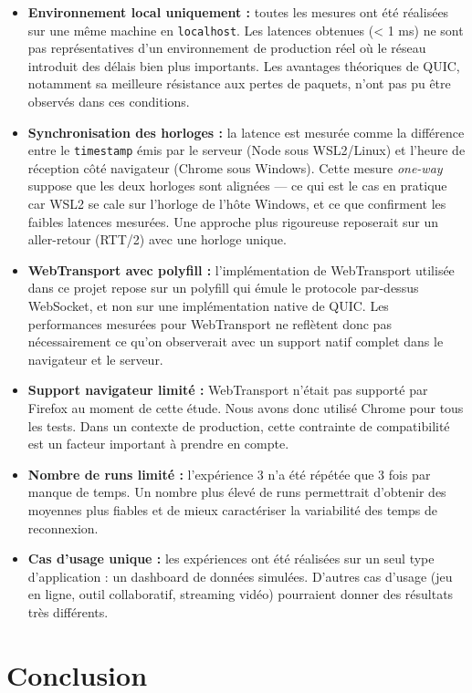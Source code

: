 \begin{itemize}
    \item \textbf{Environnement local uniquement :} toutes les mesures ont été réalisées sur une même machine en \texttt{localhost}. Les latences obtenues (< 1 ms) ne sont pas représentatives d'un environnement de production réel où le réseau introduit des délais bien plus importants. Les avantages théoriques de QUIC, notamment sa meilleure résistance aux pertes de paquets, n'ont pas pu être observés dans ces conditions.
    \item \textbf{Synchronisation des horloges :} la latence est mesurée comme la différence entre le \texttt{timestamp} émis par le serveur (Node sous WSL2/Linux) et l'heure de réception côté navigateur (Chrome sous Windows). Cette mesure \textit{one-way} suppose que les deux horloges sont alignées --- ce qui est le cas en pratique car WSL2 se cale sur l'horloge de l'hôte Windows, et ce que confirment les faibles latences mesurées. Une approche plus rigoureuse reposerait sur un aller-retour (RTT/2) avec une horloge unique.
    \item \textbf{WebTransport avec polyfill :} l'implémentation de WebTransport utilisée dans ce projet repose sur un polyfill qui émule le protocole par-dessus WebSocket, et non sur une implémentation native de QUIC. Les performances mesurées pour WebTransport ne reflètent donc pas nécessairement ce qu'on observerait avec un support natif complet dans le navigateur et le serveur.
    \item \textbf{Support navigateur limité :} WebTransport n'était pas supporté par Firefox au moment de cette étude. Nous avons donc utilisé Chrome pour tous les tests. Dans un contexte de production, cette contrainte de compatibilité est un facteur important à prendre en compte.
    \item \textbf{Nombre de runs limité :} l'expérience 3 n'a été répétée que 3 fois par manque de temps. Un nombre plus élevé de runs permettrait d'obtenir des moyennes plus fiables et de mieux caractériser la variabilité des temps de reconnexion.
    \item \textbf{Cas d'usage unique :} les expériences ont été réalisées sur un seul type d'application : un dashboard de données simulées. D'autres cas d'usage (jeu en ligne, outil collaboratif, streaming vidéo) pourraient donner des résultats très différents.
\end{itemize}

\section{Conclusion}

